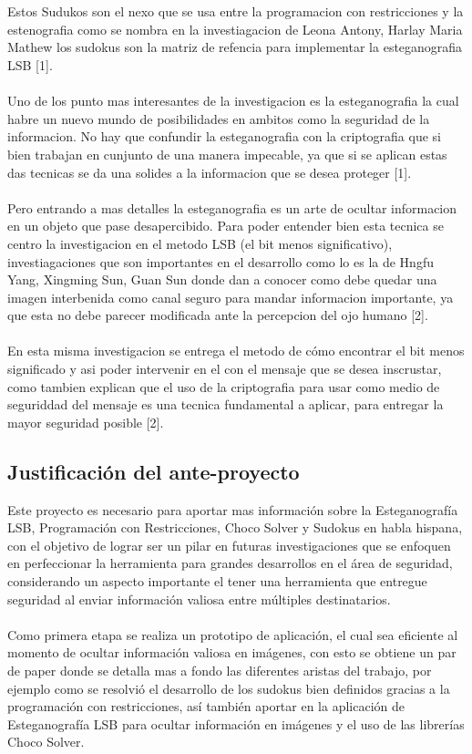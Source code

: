 \documentclass[14pt]{article}
\begin{document}
		\\~\\
Estos Sudukos son el nexo que se usa entre la programacion con restricciones y la estenografia como se nombra en la investiagacion de Leona Antony, Harlay Maria Mathew los sudokus son la matriz de refencia para implementar la esteganografia LSB [1].
		\\~\\
Uno de los punto mas interesantes de la investigacion es la esteganografia la cual habre un nuevo mundo de posibilidades en ambitos como la seguridad de la informacion. No hay que confundir la esteganografia con la criptografia que si bien trabajan en cunjunto de una manera impecable, ya que si se aplican estas das tecnicas se da una solides a la informacion que se desea proteger [1].
		\\~\\
Pero entrando a mas detalles la esteganografia es un arte de ocultar informacion en un objeto que pase desapercibido. Para poder entender bien esta tecnica se centro la investigacion en el metodo LSB (el bit menos significativo), investiagaciones que son importantes en el desarrollo como lo es la de Hngfu Yang, Xingming Sun, Guan Sun donde dan a conocer como debe quedar una imagen interbenida como canal seguro para mandar informacion importante, ya que esta no debe parecer modificada ante la percepcion del ojo humano [2].
		\\~\\
En esta misma investigacion se entrega el metodo de cómo encontrar el bit menos significado y asi poder intervenir en el con el mensaje que se desea inscrustar, como tambien explican que el uso de la criptografia para usar como medio de seguriddad del mensaje es una tecnica fundamental a aplicar, para entregar la mayor seguridad posible [2]. 


\newpage






	\subsection{Justificación del ante-proyecto}
Este proyecto es necesario para aportar mas información sobre la Esteganografía LSB, Programación con Restricciones, Choco Solver y Sudokus en habla hispana, con el objetivo de lograr ser un pilar en futuras investigaciones que se enfoquen en perfeccionar la herramienta para grandes desarrollos en el área de  seguridad, considerando un aspecto importante el tener una herramienta que entregue seguridad al enviar información valiosa entre múltiples destinatarios.
		\\~\\
Como primera etapa se realiza un  prototipo de aplicación, el cual sea  eficiente al momento de ocultar información valiosa en imágenes, con esto se obtiene  un par de paper donde se detalla mas a fondo las  diferentes aristas del trabajo, por ejemplo como se resolvió el desarrollo de los sudokus bien definidos gracias a la programación con restricciones, así también aportar en la aplicación de  Esteganografía LSB para ocultar información en imágenes y el uso de las librerías Choco Solver.
\end{document}
